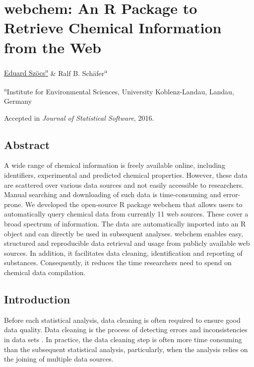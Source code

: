 

\chapter[webchem: An R Package to Retrieve Chemical Information]{webchem: An R Package to Retrieve Chemical Information from the Web}
\label{sec:webchem}  

\begin{sloppypar}
\bigskip
\underline{Eduard Szöcs\textsuperscript{a}} \& Ralf B. Schäfer\textsuperscript{a}

\bigskip
\small
\noindent 
\textsuperscript{a}Institute for Environmental Sciences, University Koblenz-Landau, Landau, Germany 

\bigskip 
\normalsize
\noindent
Accepted in \emph{Journal of Statistical Software}, 2016.

\end{sloppypar}
\cleardoublepage


\section{Abstract}
A wide range of chemical information is freely available online, including identifiers, experimental and predicted chemical properties.
However, these data are scattered over various data sources and not easily accessible to researchers.
Manual searching and downloading of such data is time-consuming and error-prone.  
We developed the open-source R package webchem that allows users to automatically query chemical data from currently 11 web sources. 
These cover a broad spectrum of information.
The data are automatically imported into an R object and can directly be used in subsequent analyses.
webchem enables easy, structured and reproducible data retrieval and usage from publicly available web sources.
In addition, it facilitates data cleaning, identification and reporting of substances.
Consequently, it reduces the time researchers need to spend on chemical data compilation.

\section[Introduction]{Introduction}
Before each statistical analysis, data cleaning is often required to ensure good data quality.
Data cleaning is the process of detecting errors and inconsistencies in data sets \citep{Chapman_2005}.
In practice, the data cleaning step is often more time consuming than the subsequent statistical analysis, particularly, when the analysis relies on the joining of multiple data sources.

